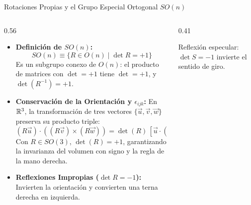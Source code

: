 \documentclass[10pt,aspectratio=169]{beamer}
\begin{document}
\begin{frame}{Rotaciones Propias y el Grupo Especial Ortogonal $SO(n)$}
  \begin{columns}[c]
    \begin{column}{0.56\textwidth}
      \footnotesize
      \begin{itemize}\itemsep2pt
        \item \textbf{Definición de $SO(n)$:}
        \[
        \boxed{SO(n) \equiv \{R \in O(n) \mid \det R = +1\}}
        \]
        Es un subgrupo conexo de $O(n)$: el producto de matrices con $\det = +1$ tiene $\det = +1$, y $\det(R^{-1}) = +1$.
        \item \textbf{Conservación de la Orientación y $\epsilon_{ijk}$:}
        En $\mathbb{R}^3$, la transformación de tres vectores $\{\vec{u}, \vec{v}, \vec{w}\}$ preserva su producto triple:
        \[
        (R\vec{u}) \cdot ((R\vec{v}) \times (R\vec{w})) = \det(R)\, [\vec{u} \cdot (\vec{v} \times \vec{w})].
        \]
        Con $R \in SO(3)$, $\det(R) = +1$, garantizando la invarianza del volumen con signo y la regla de la mano derecha.
        \item \textbf{Reflexiones Impropias ($\det R = -1$):}
        Invierten la orientación y convierten una terna derecha en izquierda.
      \end{itemize}
    \end{column}
    \begin{column}{0.41\textwidth}
      \centering
      \vspace{0.1cm}
      {\scriptsize Reflexión especular: $\det S = -1$ invierte el sentido de giro.}
    \end{column}
  \end{columns}
\end{frame}
\end{document}
